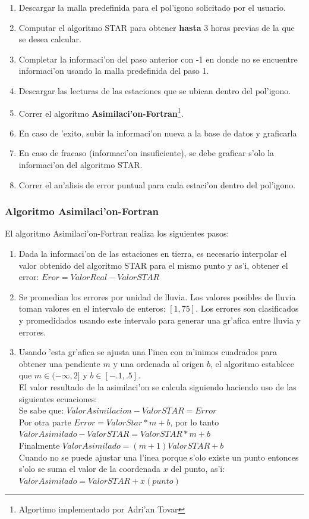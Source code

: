 \begin{enumerate}
 \item Descargar la malla predefinida para el pol'igono solicitado por el usuario.
  \item Computar el algoritmo STAR para obtener \textbf{hasta} 3 horas previas de la que se desea calcular.
  \item Completar la informaci'on del paso anterior con -1 en donde no se encuentre informaci'on usando la malla predefinida del paso 1.
  \item Descargar las lecturas de las estaciones que se ubican dentro del pol'igono.
  \item Correr el algoritmo \textbf{Asimilaci'on-Fortran}\footnote{Algortimo implementado por Adri'an Tovar }.
  \item En caso de 'exito, subir la informaci'on nueva a la base de datos y graficarla
  \item En caso de fracaso (informaci'on insuficiente), se debe graficar s'olo la informaci'on del algoritmo STAR.
  \item Correr el an'alisis de error puntual para cada estaci'on dentro del pol'igono.
\end{enumerate}

\subsubsection*{Algoritmo Asimilaci'on-Fortran}
El algoritmo Asimilaci'on-Fortran realiza los siguientes pasos:
\begin{enumerate}
  \item Dada la informaci'on de las estaciones en tierra, es necesario
    interpolar el valor obtenido del algoritmo STAR para el mismo
    punto y as'i, obtener el error: $Eror=ValorReal-ValorSTAR$ 
  \item Se promedian los errores por unidad de lluvia. Los valores
    posibles de lluvia toman valores en el intervalo de enteros:
    $[1,75]$. Los errores son clasificados y promedidados usando este
    intervalo para generar una gr'afica entre lluvia y errores. 
  \item Usando 'esta gr'afica se ajusta una l'inea con m'inimos cuadrados
    para obtener una pendiente $m$ y una ordenada al origen $b$, el
    algoritmo establece que $m \in (-\infty , 2]$ y $b \in [-.1
        ,.5]$. \\
    El valor resultado de la asimilaci'on se calcula siguiendo
    haciendo uso de las siguientes ecuaciones:\\
    Se sabe que: $ValorAsimilacion - ValorSTAR = Error$\\
    Por otra parte $Error = ValorStar*m+b$, por lo tanto\\
    $ValorAsimilado-ValorSTAR=ValorSTAR*m+b$ \\
    Finalmente $ValorAsimilado = (m+1)ValorSTAR+b$\\
    Cuando no se puede ajustar una l'inea porque s'olo existe un
    punto entonces s'olo se suma el valor de la coordenada $x$ del
    punto, as'i: $ValorAsimilado=ValorSTAR+x(punto)$
\end{enumerate}

